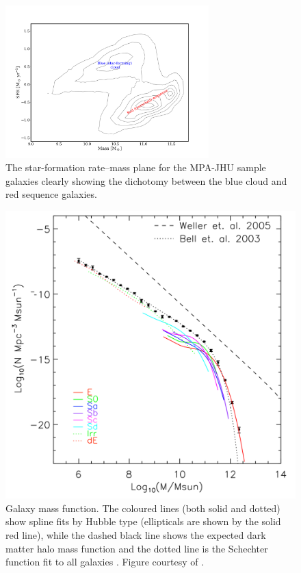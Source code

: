 	\begin{figure}
		\centering
		\includegraphics[width=0.7\textwidth]{introduction/sfMass.png}
		\caption[Star-formation rate--galaxy mass diagram]{The star-formation rate--mass plane for the MPA-JHU sample galaxies \citep{Kauffmann2003, Brinchmann2003, Salim2007} clearly showing the dichotomy between the blue cloud and red sequence galaxies.}
		\label{fig:ColourMass}
	\end{figure}

	\begin{figure}
		\centering
		\includegraphics[width=.6\textwidth]{introduction/agnFeedback.png}
		\caption[Galaxy mass function]{Galaxy mass function. The coloured lines (both solid and dotted) show spline fits by Hubble type (ellipticals are shown by the solid red line), while the dashed black line shows the expected dark matter halo mass function \citep{Weller2005} and the dotted line is the Schechter function fit to all galaxies \citep{Bell2003}. Figure courtesy of \citet{Read2005}.}
		\label{fig:massSuppression}
	\end{figure}

